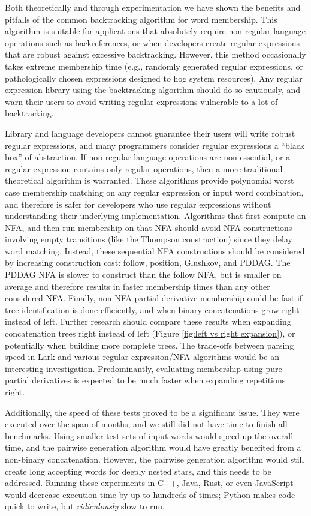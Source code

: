 Both theoretically and through experimentation we have shown the benefits and pitfalls of the common backtracking algorithm for word membership. This algorithm is suitable for applications that absolutely require non-regular language operations such as backreferences, or when developers create regular expressions that are robust against excessive backtracking. However, this method occasionally takes extreme membership time (e.g., randomly generated regular expressions, or pathologically chosen expressions designed to hog system resources). Any regular expression library using the backtracking algorithm should do so cautiously, and warn their users to avoid writing regular expressions vulnerable to a lot of backtracking.

Library and language developers cannot guarantee their users will write robust regular expressions, and many programmers consider regular expressions a ``black box'' of abstraction. If non-regular language operations are non-essential, or a regular expression contains only regular operations, then a more traditional theoretical algorithm is warranted. These algorithms provide polynomial worst case membership matching on any regular expression or input word combination, and therefore is safer for developers who use regular expressions without understanding their underlying implementation. Algorithms that first compute an NFA, and then run membership on that NFA should avoid NFA constructions involving empty transitions (like the Thompson construction) since they delay word matching. Instead, these sequential NFA constructions should be considered by increasing construction cost: follow, position, Glushkov, and PDDAG. The PDDAG NFA is slower to construct than the follow NFA, but is smaller on average and therefore results in faster membership times than any other considered NFA. Finally, non-NFA partial derivative membership could be fast if tree identification is done efficiently, and when binary concatenations grow right instead of left. Further research should compare these results when expanding concatenation trees right instead of left (Figure \ref{fig:left vs right expansion}), or potentially when building more complete trees. The trade-offs between parsing speed in Lark \cite{lark} and various regular expression/NFA algorithms would be an interesting investigation. Predominantly, evaluating membership using pure partial derivatives is expected to be much faster when expanding repetitions right.

Additionally, the speed of these tests proved to be a significant issue. They were executed over the span of months, and we still did not have time to finish all benchmarks. Using smaller test-sets of input words would speed up the overall time, and the pairwise generation algorithm \cite{pairgen} would have greatly benefited from a non-binary concatenation. However, the pairwise generation algorithm would still create long accepting words for deeply nested stars, and this needs to be addressed. Running these experiments in C++, Java, Rust, or even JavaScript would decrease execution time by up to hundreds of times; Python makes code quick to write, but \emph{ridiculously} slow to run.

